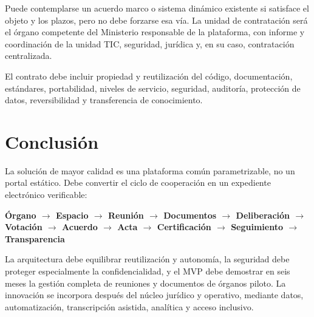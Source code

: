 \documentclass[11pt,a4paper]{article}
\begin{document}
Puede contemplarse un acuerdo marco o sistema dinámico existente si satisface el objeto y los plazos, pero no debe forzarse esa vía. La unidad de contratación será el órgano competente del Ministerio responsable de la plataforma, con informe y coordinación de la unidad TIC, seguridad, jurídica y, en su caso, contratación centralizada.

El contrato debe incluir propiedad y reutilización del código, documentación, estándares, portabilidad, niveles de servicio, seguridad, auditoría, protección de datos, reversibilidad y transferencia de conocimiento.

\section{Conclusión}

La solución de mayor calidad es una plataforma común parametrizable, no un portal estático. Debe convertir el ciclo de cooperación en un expediente electrónico verificable:
\begin{center}\Large\bfseries\color{navy}
Órgano $\rightarrow$ Espacio $\rightarrow$ Reunión $\rightarrow$ Documentos $\rightarrow$ Deliberación $\rightarrow$ Votación $\rightarrow$ Acuerdo $\rightarrow$ Acta $\rightarrow$ Certificación $\rightarrow$ Seguimiento $\rightarrow$ Transparencia
\end{center}

La arquitectura debe equilibrar reutilización y autonomía, la seguridad debe proteger especialmente la confidencialidad, y el MVP debe demostrar en seis meses la gestión completa de reuniones y documentos de órganos piloto. La innovación se incorpora después del núcleo jurídico y operativo, mediante datos, automatización, transcripción asistida, analítica y acceso inclusivo.
\end{document}
